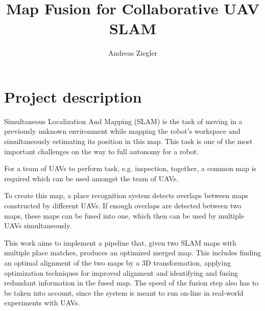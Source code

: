 \documentclass[10pt,a4paper]{article}
\author{Andreas Ziegler}
\title{Map Fusion for Collaborative UAV SLAM}
\begin{document}
\maketitle

\section{Project description}
Simultaneous Localization And Mapping (SLAM) is the task of moving in a previously unknown environment while mapping the robot’s workspace and simultaneously estimating its position in this map. This task is one of the most important challenges on the way to full autonomy for a robot.

For a team of UAVs to perform task, e.g. inspection, together, a common map is required which can be used amongst the team of UAVs.

To create this map, a place recognition system detects overlaps between maps constructed by different UAVs. If enough overlaps are detected between two maps, these maps can be fused into one, which then can be used by multiple UAVs simultaneously.

This work aims to implement a pipeline that, given two SLAM maps with multiple place matches, produces an optimized merged map. This includes finding an optimal alignment of the two maps by a 3D transformation, applying optimization techniques for improved alignment and identifying and fusing redundant information in the fused map. The speed of the fusion step also has to be taken into account, since the system is meant to run on-line in real-world experiments with UAVs.
\end{document}

